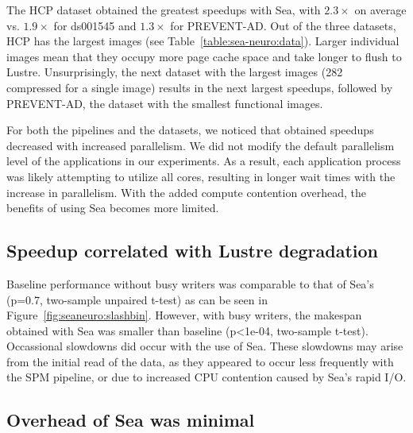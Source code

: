 \documentclass[pdflatex,sn-mathphys-num]{sn-jnl}
\theoremstyle{thmstyleone}%
\theoremstyle{thmstyletwo}%
\theoremstyle{thmstylethree}%
\begin{document}
The HCP dataset obtained the greatest speedups with
Sea, with $2.3\times$ on average vs. $1.9\times$ for ds001545  and $1.3\times$ for PREVENT-AD.
Out of the three datasets, HCP has the largest images (see
Table~\ref{table:sea-neuro:data}). Larger individual images mean that they
occupy more page cache space and take longer to flush to Lustre. Unsurprisingly,
the next dataset with the largest images (\SI{282}{\mebi\byte} compressed for a
single image) results in the next largest speedups, followed by PREVENT-AD, the
dataset with the smallest functional images.

For both the pipelines and the datasets, we noticed that obtained speedups
decreased with increased parallelism. We did not modify the default parallelism
level of the applications in our experiments. As a result, each application
process was likely attempting to utilize all cores, resulting in longer wait times
with the increase in parallelism. With the added compute contention overhead, the benefits of using
Sea becomes more limited.


\subsection{Speedup correlated with Lustre degradation}

Baseline performance without busy writers was comparable to that of Sea's (p=0.7, two-sample unpaired t-test) as can be seen in Figure~\ref{fig:seaneuro:slashbin}. However, with
busy writers, the makespan obtained with Sea was smaller than baseline (p<1e-04, two-sample t-test). Occassional slowdowns did occur with the use of Sea. These slowdowns
may arise from the initial read of the data, as they appeared to occur less
frequently with the SPM pipeline, or due to increased CPU contention caused by Sea's rapid I/O.



\subsection{Overhead of Sea was minimal}
\end{document}
